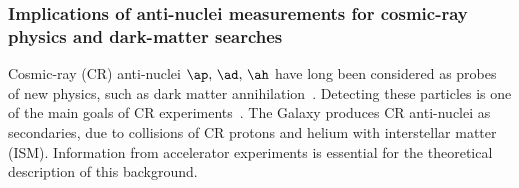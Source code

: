 \subsubsection{Implications of anti-nuclei measurements for cosmic-ray physics and dark-matter searches}

Cosmic-ray (CR) anti-nuclei $\ap,\,\ad,\,\ah$ have long been considered as probes of new physics, such as dark matter annihilation~\cite{Donato:1999gy, Baer:2005tw, Donato:2008yx, Brauninger:2009pe, Kadastik:2009ts, Cui:2010ud, Dal:2012my, Ibarra:2012cc, Fornengo:2013osa, Carlson:2014ssa, Aramaki:2015pii,Korsmeier:2017xzj}. Detecting these particles is one of the main goals of CR experiments~\cite{Giovacchini:2007dwa,kounineHebar,vonDoetinchem:2015zva,Aramaki:2015laa,Abe:2011nx}. The Galaxy produces CR anti-nuclei as secondaries, due to collisions of CR protons and helium with  interstellar matter (ISM). Information from accelerator experiments is essential for the theoretical description of this background.

